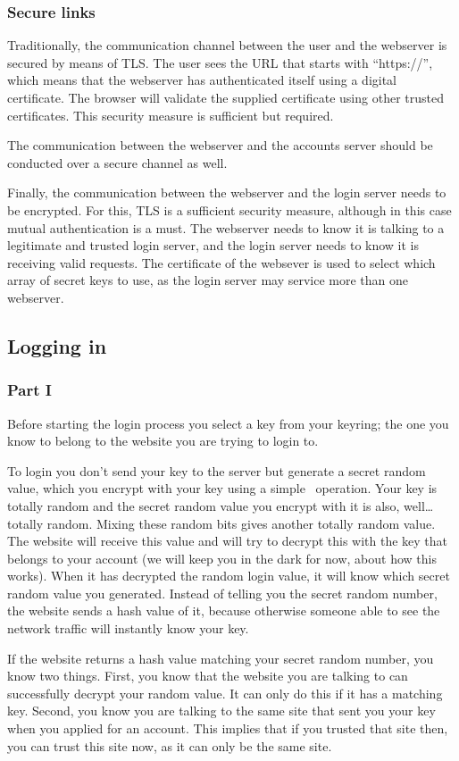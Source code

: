 \subsubsection{Secure links}
Traditionally,
the communication channel between the user and the webserver is secured by means of TLS.
The user sees the URL that starts with ``https://'',
which means that the webserver has authenticated itself using a digital certificate.
The browser will validate the supplied certificate using other trusted certificates.
This security measure is sufficient but required.
\par
The communication between the webserver and the accounts server should be conducted over a secure channel as well.
\par
Finally,
the communication between the webserver and the login server needs to be encrypted.
For this,
TLS is a sufficient security measure,
although in this case mutual authentication is a must.
The webserver needs to know it is talking to a legitimate and trusted login server,
and the login server needs to know it is receiving valid requests.
The certificate of the websever is used to select which array of secret keys to use,
as the login server may service more than one webserver.
\subsection{Logging in}
\subsubsection{Part I}
Before starting the login process you select a key from your keyring;
the one you know to belong to the website you are trying to login to.
\par
To login you don't send your key to the server but generate a secret random value,
which you encrypt with your key using a simple \XOR\ operation.
Your key is totally random and the secret random value you encrypt with it is also, well\ldots totally random.
Mixing these random bits gives another totally random value.
The website will receive this value and will try to decrypt this with the key that belongs to your account
(we will keep you in the dark for now, about how this works).
When it has decrypted the random login value,
it will know which secret random value you generated.
Instead of telling you the secret random number,
the website sends a hash value of it,
because otherwise someone able to see the network traffic will instantly know your key.
\par
If the website returns a hash value matching your secret random number, you know two things.
First, you know that the website you are talking to can successfully decrypt your random value.
It can only do this if it has a matching key.
Second, you know you are talking to the same site that sent you your key when you applied for an account.
This implies that if you trusted that site then, you can trust this site now, as it can only be the same site.

